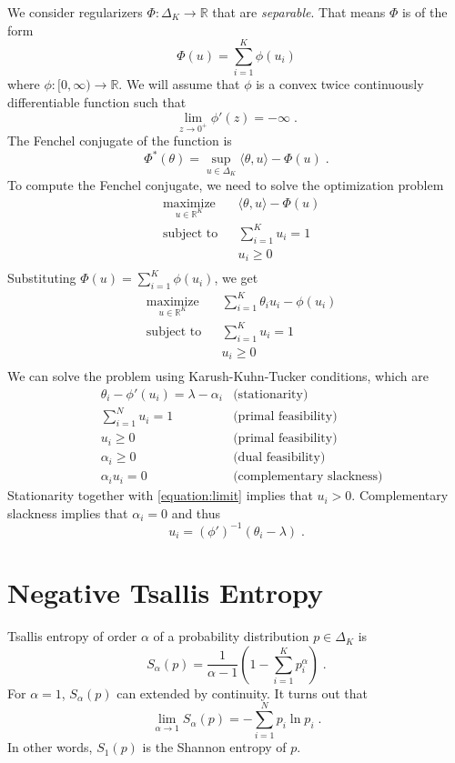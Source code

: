 \documentclass[12pt]{article}
\newcommand{\R}{\mathbb{R}}
\begin{document}
We consider regularizers $\Phi:\Delta_K \to \R$ that are \emph{separable}.
That means $\Phi$ is of the form
$$
\Phi(u) = \sum_{i=1}^K \phi(u_i)
$$
where $\phi:[0,\infty) \to \R$. We will assume that $\phi$
is a convex twice continuously differentiable
function such that
\begin{equation}
\label{equation:limit}
\lim_{z \to 0^+} \phi'(z) = -\infty \; .
\end{equation}
The Fenchel conjugate of the function is
$$
\Phi^*(\theta) = \sup_{u \in \Delta_K} \langle \theta, u \rangle - \Phi(u) \; .
$$
To compute the Fenchel conjugate, we need to solve the optimization problem
$$
\begin{aligned}
& \underset{u \in \R^K}{\text{maximize}}
& & \langle \theta, u \rangle - \Phi(u) \\
& \text{subject to} & & \sum_{i=1}^K u_i = 1 \\
& & & u_i \ge 0 \\
\end{aligned}
$$
Substituting $\Phi(u) = \sum_{i=1}^K \phi(u_i)$, we get
$$
\begin{aligned}
& \underset{u \in \R^K}{\text{maximize}}
& & \sum_{i=1}^K \theta_i u_i - \phi(u_i) \\
& \text{subject to} & & \sum_{i=1}^K u_i = 1 \\
& & & u_i \ge 0 \\
\end{aligned}
$$
We can solve the problem using Karush-Kuhn-Tucker conditions, which are
\begin{align*}
& \theta_i - \phi'(u_i) = \lambda - \alpha_i & \text{(stationarity)} \\
& \sum_{i=1}^N u_i = 1 & \text{(primal feasibility)} \\
& u_i \ge 0 & \text{(primal feasibility)} \\
& \alpha_i \ge 0 & \text{(dual feasibility)} \\
& \alpha_i u_i = 0 & \text{(complementary slackness)}
\end{align*}
Stationarity together with \eqref{equation:limit} implies
that $u_i > 0$. Complementary slackness implies that $\alpha_i = 0$
and thus
$$
u_i = (\phi')^{-1}\left(\theta_i - \lambda \right) \; .
$$

\section{Negative Tsallis Entropy}

Tsallis entropy of order $\alpha$
of a probability distribution $p \in \Delta_K$ is
$$
S_\alpha(p) = \frac{1}{\alpha - 1} \left(1 - \sum_{i=1}^K p_i^\alpha \right) \; .
$$
For $\alpha = 1$, $S_\alpha(p)$ can extended by continuity. It turns
out that
$$
\lim_{\alpha \to 1} S_\alpha(p) = - \sum_{i=1}^N p_i \ln p_i \; .
$$
In other words, $S_1(p)$ is the Shannon entropy of $p$.
\end{document}
